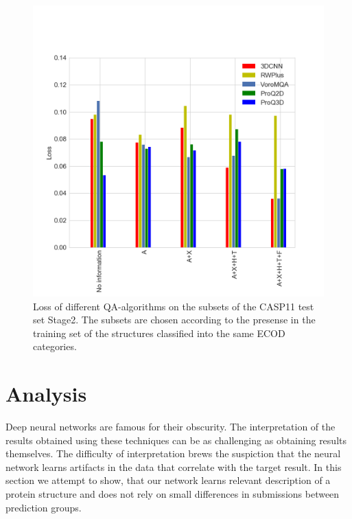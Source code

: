 \documentclass[letter,10pt]{article}
\begin{document}
\begin{figure}[H]
    \centering
    \includegraphics[width=\linewidth]{Fig/LossVsECOD.png}
    \caption{Loss of different QA-algorithms on the subsets of the CASP11 test set Stage2. The subsets are chosen according to the presense in the
    training set of the structures classified into the same ECOD categories.}
    \label{Fig:LossVsECOD}
\end{figure}

\section{Analysis}
Deep neural networks are famous for their obscurity. The interpretation of the results obtained using these techniques can be as challenging 
as obtaining results themselves. The difficulty of interpretation brews the suspiction that the neural network learns 
artifacts in the data that correlate with the target result. In this section we attempt to show, that our network 
learns relevant description of a protein structure and does not rely on small differences in submissions between prediction groups.
\end{document}
